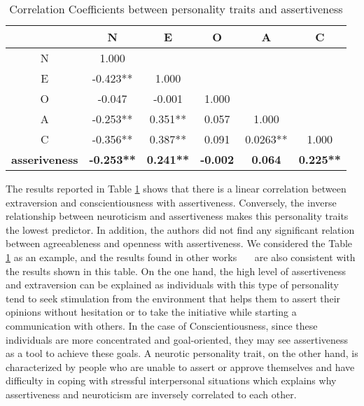 \documentclass[12pt]{article}
\begin{document}
\begin{table} [h]
\caption{Correlation Coefficients between personality traits and assertiveness}
\centering
\begin{tabular}{c c c c c c} 
\\
 \hline \hline
						& \textbf{N} 			&\textbf{E}		&\textbf{O}		&\textbf{A}		&\textbf{C}	\\ [0.5ex] 
 \hline
 N 						& 1.000 				&				&				&				&	\\ 
 E 						& -0.423** 			&1.000			&				&				&	\\
 O 						& -0.047 				&-0.001			&1.000			&				&	\\
 A 						& -0.253** 			&0.351**			&0.057			&1.000			&	\\
 C 						& -0.356** 			&0.387**			&0.091			&0.0263**			&1.000	\\ [1ex] 
 \hline
 \textbf{asseriveness}  		& \textbf{-0.253**}		&\textbf{0.241**}	&\textbf{-0.002}		&\textbf{0.064}		&\textbf{0.225**}	\\
 \hline \hline
 \end{tabular}
 \label{table:1}
 \end{table}
 
\par The results reported in Table \ref{table:1} shows that there is a linear correlation between extraversion and conscientiousness with assertiveness. Conversely, the inverse relationship between neuroticism and assertiveness makes this personality traits the lowest predictor. In addition, the authors did not find any significant relation between agreeableness and openness with assertiveness. We considered the Table \ref{table:1} as an example, and the results found in other works~\cite{kirst2011investigating}~\cite{ramanaiah1993neo}~\cite{lefevre1981assertiveness} are also consistent with the results shown in this table. On the one hand, the high level of assertiveness and extraversion can be explained as individuals with this type of personality tend to seek stimulation from the environment that helps them to assert their opinions without hesitation or to take the initiative while starting a communication with others. In the case of Conscientiousness, since these individuals are more concentrated and goal-oriented, they may see assertiveness as a tool to achieve these goals. A neurotic personality trait, on the other hand, is characterized by people who are unable to assert or approve themselves and have difficulty in coping with stressful interpersonal situations which explains why assertiveness and neuroticism are inversely correlated to each other.
\end{document}
